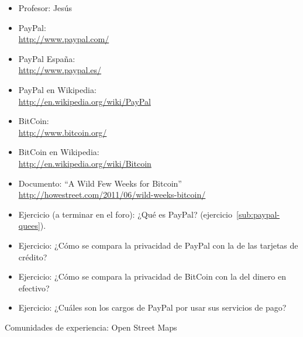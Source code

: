 \documentclass[a4paper,12pt]{article}
\begin{document}
\begin{itemize}
\item Profesor: Jesús

\item PayPal: \\
  \url{http://www.paypal.com/}

\item PayPal España: \\
  \url{http://www.paypal.es/}

\item PayPal en Wikipedia: \\
  \url{http://en.wikipedia.org/wiki/PayPal}

\item BitCoin: \\
  \url{http://www.bitcoin.org/}

\item BitCoin en Wikipedia: \\
  \url{http://en.wikipedia.org/wiki/Bitcoin}

\item Documento: ``A Wild Few Weeks for Bitcoin'' \\
  \url{http://howestreet.com/2011/06/wild-weeks-bitcoin/}

\item Ejercicio (a terminar en el foro): ¿Qué es PayPal? (ejercicio~\ref{sub:paypal-quees}).

\item Ejercicio: ¿Cómo se compara la privacidad de PayPal con la de las tarjetas de crédito?

\item Ejercicio: ¿Cómo se compara la privacidad de BitCoin con la del dinero en efectivo?

\item Ejercicio: ¿Cuáles son los cargos de PayPal por usar sus servicios de pago?
\end{itemize}

Comunidades de experiencia: Open Street Maps
\end{document}
